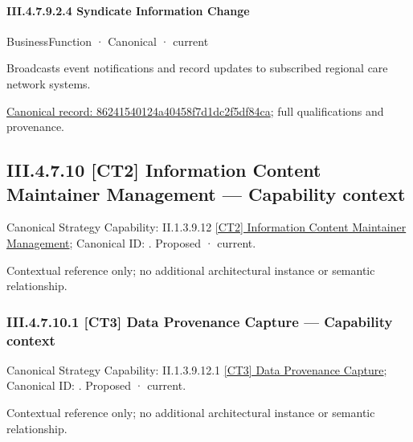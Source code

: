 \paragraph*{III.4.7.9.2.4 Syndicate Information Change}
\label{navigation:III.4.7.9.2.4}

\label{element:86241540124a40458f7d1dc2f5df84ca}
{\small BusinessFunction · Canonical · current}\par

Broadcasts event notifications and record updates to subscribed regional care network systems.


{\footnotesize \href{../../../../../../../continuum/business/business-function/86241540124a40458f7d1dc2f5df84ca.md}{Canonical record: 86241540124a40458f7d1dc2f5df84ca}; full qualifications and provenance.}\par
\subsection*{III.4.7.10 [CT2] Information Content Maintainer Management — Capability context}
\label{navigation:III.4.7.10}

{\small Canonical Strategy Capability: II.1.3.9.12 \hyperref[element:b81a1ab42af24c2e9896b8f3f78d291a]{[CT2] Information Content Maintainer Management}; Canonical ID: \texttt{}. Proposed · current.}\par
Contextual reference only; no additional architectural instance or semantic relationship.\par
\subsubsection*{III.4.7.10.1 [CT3] Data Provenance Capture — Capability context}
\label{navigation:III.4.7.10.1}

{\small Canonical Strategy Capability: II.1.3.9.12.1 \hyperref[element:44a7937520a54945b06b5fd4a2bbd870]{[CT3] Data Provenance Capture}; Canonical ID: \texttt{}. Proposed · current.}\par
Contextual reference only; no additional architectural instance or semantic relationship.\par

